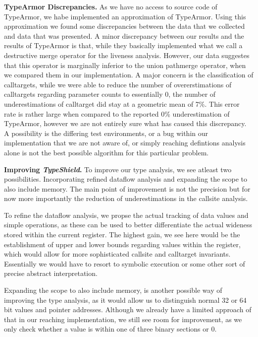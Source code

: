 \textbf{TypeArmor Discrepancies.}
\label{section:discrep}
As we have no access to source code of TypeArmor, we habe implemented an approximation
of TypeArmor. Using this approximation we found some discrepancies between the data that we collected
and data that was presented.
A minor discrepancy between our results and the results of TypeArmor is that, while they basically implemented
what we call a destructive merge operator for the liveness analysis. However, our data suggestes that this
operator is marginally inferior to the union pathmerge operator, when we compared them in our implementation.
A major concern is the classification of calltargets, while we were able to reduce the number of overerstimations
of calltargets regarding parameter counts to essentially 0, the number of underestimations of calltarget did
stay at a geometric mean of 7\%. This error rate is rather large when compared to the reported 0\% underestimation
of TypeArmor, however we are not entirely sure what has caused this discrepancy. A possibility is the differing
test environments, or a bug within our implementation that we are not aware of, or simply reaching defintions
analysis alone is not the best possible algorithm for this particular problem.

\textbf{Improving \textit{TypeShield}.}
\label{section:venuesimp}
To improve our type analysis, we see atleast two possibilities. Incorporating refined dataflow analysis and 
expanding the scope to also include memory. The main point of improvement is not the precision but for now 
more importantly the reduction of underestimations in the callsite analysis.

To refine the dataflow analysis, we propse the actual tracking of data values and simple operations, as these
can be used to better differentiate the actual wideness stored within the current register. The highest gain, 
we see here would be the establishment of upper and lower bounds regarding values within the register, which 
would allow for more sophisticated callsite and calltarget invariants. Essentially we would have to resort 
to symbolic execution or some other sort of precise abstract interpretation.

Expanding the scope to also include memory, is another possible way of improving the type analysis, as it 
would allow us to distinguish normal 32 or 64 bit values and pointer addresses. Although we already have a 
limited approach of that in our reaching implementation, we still see room for improvement, as we only check
whether a value is within one of three binary sections or 0.

